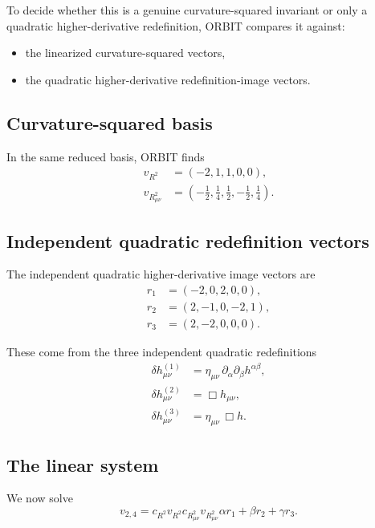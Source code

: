 \documentclass[11pt]{article}
\begin{document}
To decide whether this is a genuine curvature-squared invariant or only a quadratic higher-derivative redefinition, ORBIT compares it against:
\begin{itemize}
\item the linearized curvature-squared vectors,
\item the quadratic higher-derivative redefinition-image vectors.
\end{itemize}

\subsection{Curvature-squared basis}

In the same reduced basis, ORBIT finds
\begin{align}
v_{R^2} &= (-2,1,1,0,0),\\
v_{R_{\mu\nu}^2} &= \left(-\frac12,\frac14,\frac12,-\frac12,\frac14\right).
\end{align}

\subsection{Independent quadratic redefinition vectors}

The independent quadratic higher-derivative image vectors are
\begin{align}
r_1 &= (-2,0,2,0,0),\\
r_2 &= (2,-1,0,-2,1),\\
r_3 &= (2,-2,0,0,0).
\end{align}

These come from the three independent quadratic redefinitions
\begin{align}
\delta h^{(1)}_{\mu\nu} &= \eta_{\mu\nu}\,\partial_\alpha\partial_\beta h^{\alpha\beta},\\
\delta h^{(2)}_{\mu\nu} &= \Box h_{\mu\nu},\\
\delta h^{(3)}_{\mu\nu} &= \eta_{\mu\nu}\,\Box h.
\end{align}

\subsection{The linear system}

We now solve
\begin{equation}
v_{2,4}
=
c_{R^2}v_{R^2}
c_{R_{\mu\nu}^2}v_{R_{\mu\nu}^2}
\alpha r_1+\beta r_2+\gamma r_3.
\end{equation}
\end{document}
